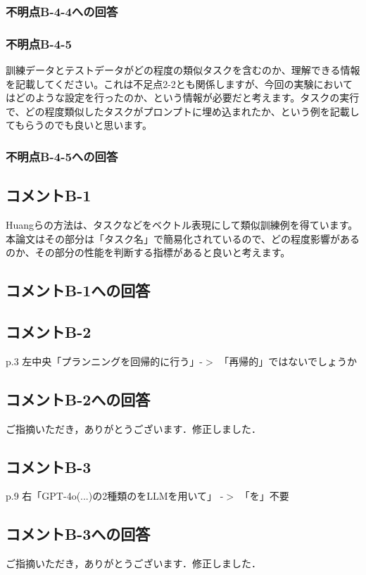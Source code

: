 \documentclass{jsarticle}
\begin{document}
\subsubsection*{不明点B-4-4への回答}

\subsubsection*{不明点B-4-5}
\begin{screen}
訓練データとテストデータがどの程度の類似タスクを含むのか、理解できる情報を記載してください。これは不足点2-2とも関係しますが、今回の実験においてはどのような設定を行ったのか、という情報が必要だと考えます。タスクの実行で、どの程度類似したタスクがプロンプトに埋め込まれたか、という例を記載してもらうのでも良いと思います。
\end{screen}
\subsubsection*{不明点B-4-5への回答}

\subsection*{コメントB-1}
\begin{screen}
Huangらの方法は、タスクなどをベクトル表現にして類似訓練例を得ています。本論文はその部分は「タスク名」で簡易化されているので、どの程度影響があるのか、その部分の性能を判断する指標があると良いと考えます。
\end{screen}
\subsection*{コメントB-1への回答}

\subsection*{コメントB-2}
\begin{screen}
p.3 左中央「プランニングを回帰的に行う」-$>$ 「再帰的」ではないでしょうか
\end{screen}

\subsection*{コメントB-2への回答}
ご指摘いただき，ありがとうございます．修正しました．

\subsection*{コメントB-3}
\begin{screen}
p.9 右「GPT-4o(...)の2種類のをLLMを用いて」 -$>$ 「を」不要
\end{screen}

\subsection*{コメントB-3への回答}
ご指摘いただき，ありがとうございます．修正しました．
\end{document}
